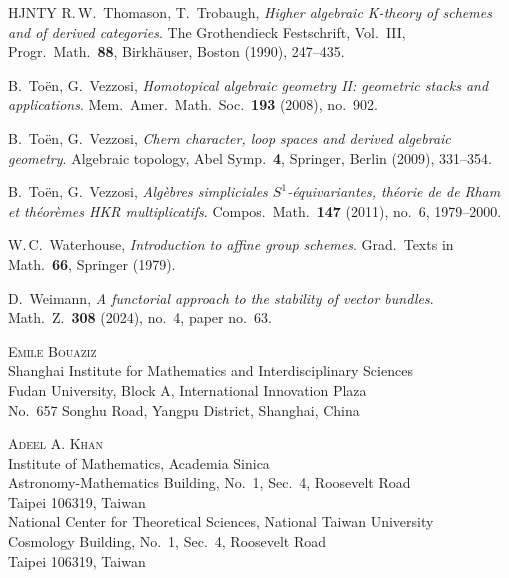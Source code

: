 \documentclass[12pt, oneside]{amsart}
\numberwithin{equation}{section}
\theoremstyle{remark}
\theoremstyle{plain}
\begin{document}
\begin{thebibliography}{HJNTY}
   R.\,W.~Thomason, T.~Trobaugh, \textit{Higher algebraic K-theory of schemes and of derived categories}. The Grothendieck Festschrift, Vol.~III, Progr.\ Math.\ {\bf{88}}, Birkh\"auser, Boston (1990), 247--435.

   B.~To\"en, G.~Vezzosi, \textit{Homotopical algebraic geometry II: geometric stacks and applications}. Mem.\ Amer.\ Math.\ Soc.\ {\bf{193}} (2008), no.~902.

   B.~To\"en, G.~Vezzosi, \textit{Chern character, loop spaces and derived algebraic geometry}. Algebraic topology, Abel Symp.\ {\bf{4}}, Springer, Berlin (2009), 331--354.

   B.~To\"en, G.~Vezzosi, \textit{Alg\`ebres simpliciales $S^1$-\'equivariantes, th\'eorie de de Rham et th\'eor\`emes HKR multiplicatifs}. Compos.\ Math.\ {\bf{147}} (2011), no.~6, 1979--2000.

   W.\,C.~Waterhouse, \textit{Introduction to affine group schemes}. Grad.\ Texts in Math.\ {\bf{66}}, Springer (1979).

   D.~Wei{}mann, \textit{A functorial approach to the stability of vector bundles}. Math.\ Z.\ {\bf{308}} (2024), no.~4, paper no.~63.

\end{thebibliography}

\bigskip
{\footnotesize \parskip 0pt \parindent 0pt
\textsc{Emile Bouaziz}\\[0.2em]
Shanghai Institute for Mathematics and Interdisciplinary Sciences\\
Fudan University, Block A, International Innovation Plaza\\
No.~657 Songhu Road, Yangpu District, Shanghai, China

\medskip
\textsc{Adeel A. Khan}\\[0.2em]
Institute of Mathematics, Academia Sinica\\
Astronomy-Mathematics Building, No.~1, Sec.~4, Roosevelt Road\\
Taipei 106319, Taiwan\\[0.4em]
National Center for Theoretical Sciences, National Taiwan University\\
Cosmology Building, No.~1, Sec.~4, Roosevelt Road\\
Taipei 106319, Taiwan\par}
\end{document}
